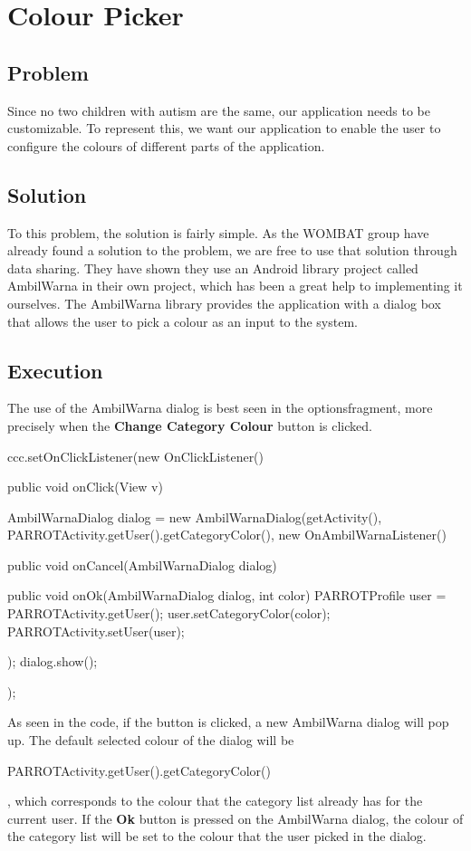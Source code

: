 \section{Colour Picker}%
\subsection{Problem}
Since no two children with autism are the same, our application needs to be customizable. To represent this, we want our application to enable the user to configure the colours of different parts of the application.

\subsection{Solution}
To this problem, the solution is fairly simple. As the WOMBAT group have already found a solution to the problem, we are free to use that solution through data sharing. %
They have shown they use an Android library project called AmbilWarna in their own project, which has been a great help to implementing it ourselves. The AmbilWarna library provides the application with a dialog box that allows the user to pick a colour as an input to the system.

\subsection{Execution}{}
The use of the AmbilWarna dialog is best seen in the optionsfragment, more precisely when the \textbf{Change Category Colour} button is clicked.

\begin{source}{}
		ccc.setOnClickListener(new OnClickListener() {
			public void onClick(View v) {
				AmbilWarnaDialog dialog = new AmbilWarnaDialog(getActivity(),
						PARROTActivity.getUser().getCategoryColor(), new OnAmbilWarnaListener() {
					public void onCancel(AmbilWarnaDialog dialog) {
					}

					public void onOk(AmbilWarnaDialog dialog, int color) {
						PARROTProfile user = PARROTActivity.getUser();
						user.setCategoryColor(color);
						PARROTActivity.setUser(user);
					}
				});
				dialog.show();
			}
		});
\end{source}

As seen in the code, if the button is clicked, a new AmbilWarna dialog will pop up. The default selected colour of the dialog will be 
\begin{source}{}
PARROTActivity.getUser().getCategoryColor()
\end{source}, which corresponds to the colour that the category list already has for the current user.\newline
If the \textbf{Ok} button is pressed on the AmbilWarna dialog, the colour of the category list will be set to the colour that the user picked in the dialog.

